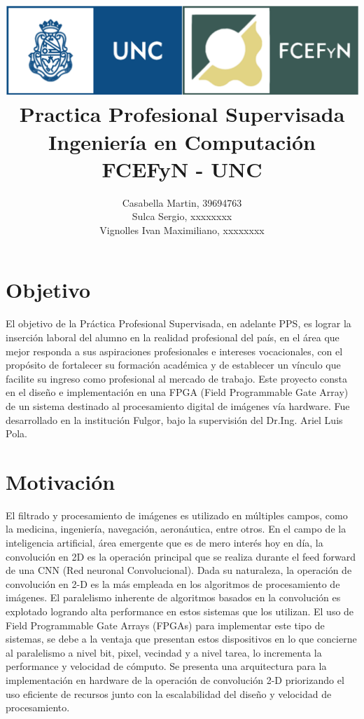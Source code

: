 \documentclass[a4paper]{article}
\begin{document}
\title{%
\includegraphics[scale = 0.5]{./header_unc.png}\\[1.0 cm]	%
  Practica Profesional Supervisada\\
  \large Ingeniería en Computación FCEFyN - UNC
  }


  \author{ Casabella Martin, 39694763\\
			Sulca Sergio, xxxxxxxx\\
			Vignolles Ivan Maximiliano, xxxxxxxx
}
\clearpage
\maketitle

\section*{Objetivo} \label{objetivo_sec}
El objetivo de la Práctica Profesional Supervisada, en adelante PPS, es lograr la inserción laboral del alumno en la realidad profesional del país, en el área que mejor responda a sus aspiraciones profesionales e intereses vocacionales, con el propósito de fortalecer su formación académica y de establecer un vínculo que facilite su ingreso como profesional al mercado de trabajo. 
Este proyecto consta en el diseño e implementación en una FPGA (Field Programmable Gate Array) de un sistema destinado al procesamiento digital de imágenes vía hardware. 
Fue desarrollado en la institución Fulgor, bajo la supervisión del Dr.Ing. Ariel Luis Pola.

\section*{Motivación}  \label{motiv_sec}
El filtrado y procesamiento de imágenes es utilizado en múltiples campos, como la medicina, ingeniería, navegación, aeronáutica, entre otros. En el campo de la inteligencia artificial, área emergente que es de mero interés hoy en día, la convolución en 2D es la operación principal que se realiza durante el feed forward de una CNN (Red neuronal Convolucional). 
Dada su naturaleza, la operación de convolución en 2-D es la más empleada en los algoritmos de procesamiento de imágenes. El paralelismo inherente de algoritmos basados en la convolución es explotado logrando alta performance en estos sistemas que los utilizan.
El uso de Field Programmable Gate Arrays (FPGAs) para implementar este tipo de sistemas, se debe a la ventaja que presentan estos dispositivos en lo que concierne al paralelismo a nivel bit, pixel, vecindad y a nivel tarea, lo incrementa la performance y velocidad de cómputo.
Se presenta una arquitectura para la implementación en hardware de la operación de convolución 2-D priorizando el uso eficiente de recursos junto con la escalabilidad del diseño y velocidad de procesamiento.
\end{document}
